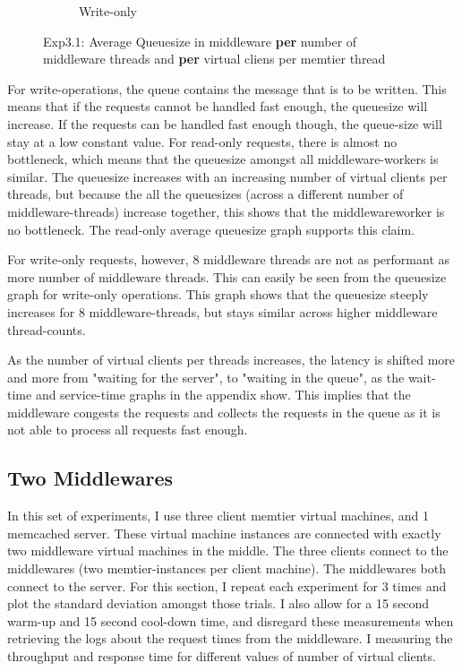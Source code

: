 \documentclass[11pt,a4paper]{article}
\begin{document}
\begin{figure}[H]
\begin{subfigure}{.5\textwidth}
    \caption{Write-only}
    \label{fig:mesh1}
\end{subfigure}
\caption{Exp3.1: Average Queuesize in middleware \textbf{per} number of middleware threads and \textbf{per} virtual cliens per memtier thread}
\label{fig:test}
\end{figure}

For write-operations, the queue contains the message that is to be written.
This means that if the requests cannot be handled fast enough, the queuesize will increase.
If the requests can be handled fast enough though, the queue-size will stay at a low constant value.
For read-only requests, there is almost no bottleneck, which means that the queuesize amongst all middleware-workers is similar.
The queuesize increases with an increasing number of virtual clients per threads, but because the all the queuesizes (across a different number of middleware-threads) increase together, this shows that the middlewareworker is no bottleneck.
The read-only average queuesize graph supports this claim.

For write-only requests, however, 8 middleware threads are not as performant as more number of middleware threads.
This can easily be seen from the queuesize graph for write-only operations.
This graph shows that the queuesize steeply increases for 8 middleware-threads, but stays similar across higher middleware thread-counts.

As the number of virtual clients per threads increases, the latency is shifted more and more  from "waiting for the server", to "waiting in the queue", as the wait-time and service-time graphs in the appendix show.
This implies that the middleware congests the requests and collects the requests in the queue as it is not able to process all requests fast enough.

\subsection{Two Middlewares}

In this set of experiments, I use three client memtier virtual machines, and 1 memcached server.
These virtual machine instances are connected with exactly two middleware virtual machines in the middle.
The three clients connect to the middlewares (two memtier-instances per client machine). 
The middlewares both connect to the server.
For this section, I repeat each experiment for 3 times and plot the standard deviation amongst those trials.
I also allow for a 15 second warm-up and 15 second cool-down time, and disregard these measurements when retrieving the logs about the request times from the middleware.
I measuring the throughput and response time for different values of number of virtual clients.
\end{document}
